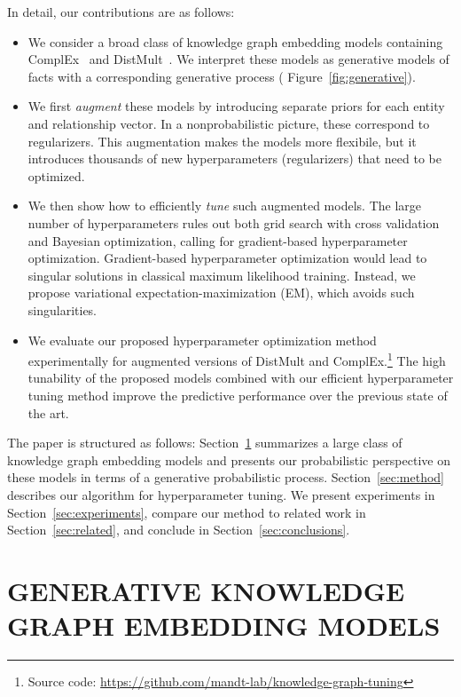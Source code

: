 \documentclass[letterpage]{article}
\begin{document}
In detail, our contributions are as follows:
\begin{itemize}
  \item
    We consider a broad class of knowledge graph embedding models containing ComplEx~\citep{TWR2016} and DistMult~\citep{BWXJL2015}.
    We interpret these models as generative models of facts with a corresponding generative process ( Figure~\ref{fig:generative}).
  \item
    We first \emph{augment} these models by introducing separate priors for each
    entity and relationship vector.
    In a nonprobabilistic picture, these correspond to regularizers.
    This augmentation makes the models more flexibile, but it introduces thousands of new hyperparameters (regularizers) that need to be optimized.
  \item
    We then show how to efficiently \emph{tune} such augmented models.
    The large number of hyperparameters rules out both grid search with cross validation and Bayesian optimization, calling for gradient-based hyperparameter optimization.
    Gradient-based hyperparameter optimization would lead to singular solutions in classical maximum likelihood training.
    Instead, we propose variational expectation-maximization (EM), which avoids such singularities.
  \item
    We evaluate our proposed hyperparameter optimization method experimentally for augmented versions of DistMult and ComplEx.\footnote{Source code: \url{https://github.com/mandt-lab/knowledge-graph-tuning}}
    The high tunability of the proposed models combined with our efficient hyperparameter tuning method improve the predictive performance over the previous state of the art.
\end{itemize}


The paper is structured as follows:
Section~\ref{sec:model} summarizes a large class of knowledge graph embedding models and presents our probabilistic perspective on these models in terms of a generative probabilistic process.
Section~\ref{sec:method} describes our algorithm for hyperparameter tuning.
We present experiments in
Section~\ref{sec:experiments}, compare our method to related work in Section~\ref{sec:related}, and conclude in Section~\ref{sec:conclusions}.
 \section{GENERATIVE KNOWLEDGE GRAPH EMBEDDING MODELS}
\label{sec:model}
\end{document}

